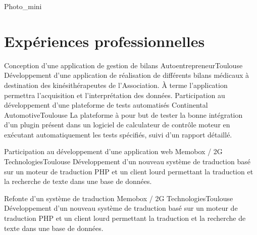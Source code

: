 \documentclass{my_cv_bis}
\begin{document}
 {
}{Photo_mini}

 \vspace{-5mm}
\section{Expériences professionnelles}
	{Conception d’une application de gestion de bilans}
	{Autoentrepreneur}{Toulouse}
	{
	Développement d'une application de réalisation de différents bilans médicaux à destination des kinésithérapeutes 
	de l'Association. À terme l'application permettra l'acquisition et l'interprétation des données.
	}
	{}
	{Participation au développement d'une plateforme de tests automatisés}
	{Continental Automotive}{Toulouse}
	{
	La plateforme à pour but de tester la bonne intégration d'un plugin présent dans un logiciel de calculateur de contrôle moteur en exécutant
	automatiquement les tests spécifiés, suivi d'un rapport détaillé.
	}
	{}

	{ Participation au développement d'une application web}
	{Memobox / 2G Technologies}{Toulouse}
	{Développement d'un nouveau système de traduction basé sur un moteur de traduction PHP et un client lourd
	permettant la traduction et la recherche de texte dans une base de données.  } {}

	{ Refonte d’un système de traduction }
	{Memobox / 2G Technologies}{Toulouse}
	{Développement d'un nouveau système de traduction basé sur un moteur de traduction PHP et un client lourd
	permettant la traduction et la recherche de texte dans une base de données.  } {}
\end{document}
